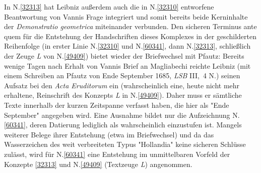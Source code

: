 \begin{ledgroup}
In N.\;\ref{32313} hat Leibniz außerdem auch die in N.\;\ref{32310} entworfene Beantwortung von Vannis Frage integriert und somit bereits beide Kerninhalte der \textit{Demonstratio geometrica} miteinander verbunden.
\pend
\pstart
Den sicheren Terminus ante quem für die Entstehung der Handschriften dieses Komplexes in der geschilderten Reihenfolge (in erster Linie N.\;\ref{32310} und N.\;\ref{60341}, dann N.\;\ref{32313}, schließlich der Zeuge \textit{L} von N.\;\ref{49409}) bietet wieder der Briefwechsel mit Pfautz:
Bereits wenige Tagen nach Erhalt von Vannis Brief an Magliabechi reichte Leibniz (mit einem \cite{02011}Schreiben an Pfautz von Ende September 1685, \textit{LSB} III,~4 N.)
seinen Aufsatz bei den \cite{01023}\textit{Acta Eruditorum} ein (wahrscheinlich eine, heute nicht mehr erhaltene, Reinschrift des Konzepts \textit{L} in N.\;\ref{49409}).
Daher muss er sämtliche Texte innerhalb der kurzen Zeitspanne verfasst haben, die hier als "Ende September" angegeben wird.
Eine Ausnahme bildet nur die Aufzeichnung N.\;\ref{60341}, deren Datierung lediglich als wahrscheinlich einzustufen ist. Mangels weiterer Belege ihrer Entstehung (etwa im Briefwechsel) und da das Wasserzeichen des weit verbreiteten Typus "Hollandia" keine sicheren Schlüsse zulässt, wird für N.\;\ref{60341} eine Entstehung im unmittelbaren Vorfeld der Konzepte \ref{32313} und N.\;\ref{49409} (Textzeuge \textit{L}) angenommen.
\pend
\end{ledgroup}
